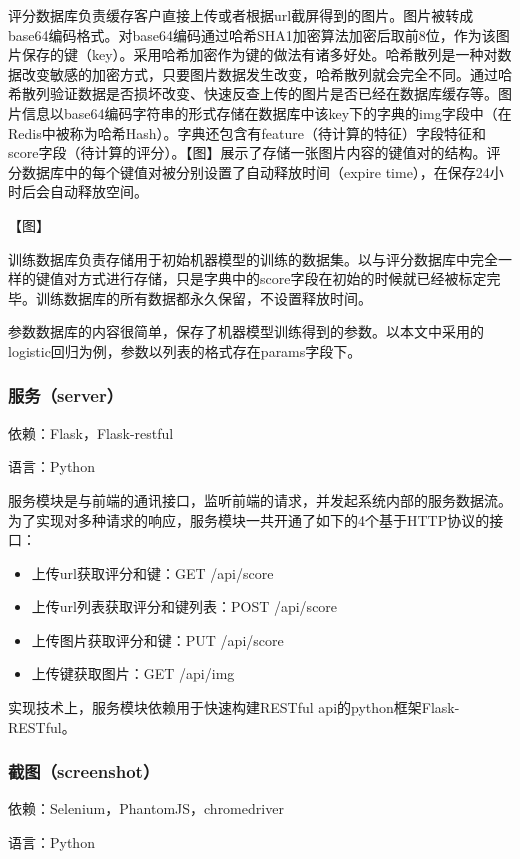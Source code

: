评分数据库负责缓存客户直接上传或者根据url截屏得到的图片。图片被转成base64编码格式。对base64编码通过哈希SHA1加密算法加密后取前8位，作为该图片保存的键（key）。采用哈希加密作为键的做法有诸多好处。哈希散列是一种对数据改变敏感的加密方式，只要图片数据发生改变，哈希散列就会完全不同。通过哈希散列验证数据是否损坏改变、快速反查上传的图片是否已经在数据库缓存等。图片信息以base64编码字符串的形式存储在数据库中该key下的字典的img字段中（在Redis中被称为哈希Hash）。字典还包含有feature（待计算的特征）字段特征和score字段（待计算的评分）。【图】展示了存储一张图片内容的键值对的结构。评分数据库中的每个键值对被分别设置了自动释放时间（expire time），在保存24小时后会自动释放空间。

【图】

训练数据库负责存储用于初始机器模型的训练的数据集。以与评分数据库中完全一样的键值对方式进行存储，只是字典中的score字段在初始的时候就已经被标定完毕。训练数据库的所有数据都永久保留，不设置释放时间。

参数数据库的内容很简单，保存了机器模型训练得到的参数。以本文中采用的logistic回归为例，参数以列表的格式存在params字段下。

\subsubsection{服务（server）}
依赖：Flask，Flask-restful

语言：Python

服务模块是与前端的通讯接口，监听前端的请求，并发起系统内部的服务数据流。为了实现对多种请求的响应，服务模块一共开通了如下的4个基于HTTP协议的接口：

\begin{itemize}
  \item 上传url获取评分和键：GET  /api/score
  \item 上传url列表获取评分和键列表：POST  /api/score
  \item 上传图片获取评分和键：PUT  /api/score
  \item 上传键获取图片：GET /api/img
\end{itemize}

实现技术上，服务模块依赖用于快速构建RESTful api的python框架Flask-RESTful。

\subsubsection{截图（screenshot）}

依赖：Selenium，PhantomJS，chromedriver

语言：Python

